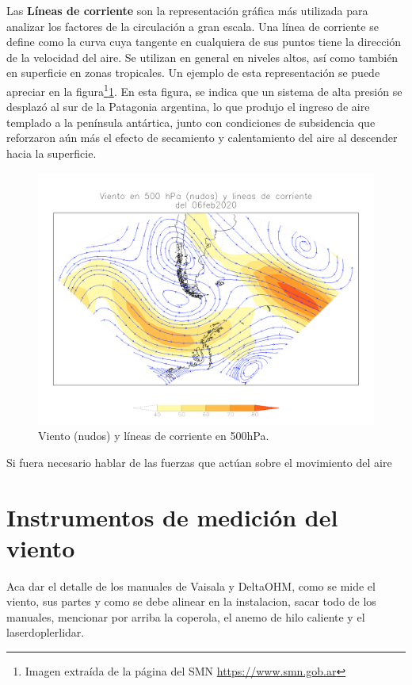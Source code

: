 Las \textbf{Líneas de corriente} son la representación gráfica más utilizada para analizar los factores de la circulación a gran escala. Una línea de corriente se define como la curva cuya tangente en cualquiera de sus puntos tiene la dirección de la velocidad del aire. Se utilizan en general en niveles altos, así como también en superficie en zonas tropicales. Un ejemplo de esta representación se puede apreciar en la figura\footnote{Imagen extraída de la página del SMN \url{https://www.smn.gob.ar}}\ref{fig:mapaLineas}. En esta figura, se indica que un sistema de alta presión se desplazó al sur de la Patagonia argentina, lo que produjo el ingreso de aire templado a la península antártica, junto con condiciones de subsidencia que reforzaron aún más el efecto de secamiento y calentamiento del aire al descender hacia la superficie.

\begin{figure}[H]
    \centering
    \includegraphics[width=1\linewidth]{Figuras/viento/mapalineasViento.png}
    \caption{Viento (nudos) y líneas de corriente en 500\unit{\hecto\pascal}.}
    \label{fig:mapaLineas}
\end{figure}


Si fuera necesario hablar de las fuerzas que actúan sobre el movimiento del aire

\section{Instrumentos de medición del viento}\label{sec:instrumentos_med_viento}
Aca dar el detalle de los manuales de Vaisala y DeltaOHM, como se mide el viento, sus partes y como se debe alinear en la instalacion, sacar todo de los manuales, mencionar por arriba la coperola, el anemo de hilo caliente y el laserdoplerlidar.



